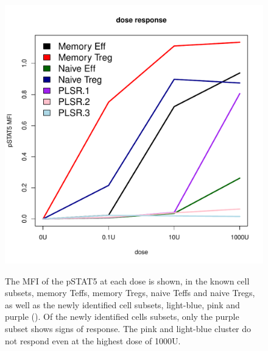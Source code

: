 \begin{figure}
\begin{minipage}{.6\textwidth}
  \includegraphics[width=\linewidth]{figures/plsr-lymphocytes-dose-response.pdf}
\end{minipage}
\begin{minipage}{.3\textwidth}
{
    The MFI of the pSTAT5 at each dose is shown, in the known cell subsets, memory Teffs, memory Tregs, naive Teffs
    and naive Tregs, as well as the newly identified cell subsets, light-blue, pink and purple ().
    Of the newly identified cells subsets, only the purple subset shows signs of response.
    The pink and light-blue cluster do not respond even at the highest dose of 1000U.
}
\end{minipage}
\end{figure}

\clearpage


